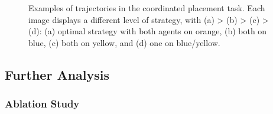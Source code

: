 \begin{figure}[t]
    \centering
    \centering
    \caption{Examples of trajectories in the coordinated placement task. Each image displays a different level of strategy, with (a) > (b) > (c) > (d): (a) optimal strategy with both agents on orange, (b) both on blue, (c) both on yellow, and (d) one on blue/yellow.}
    \label{fig:JIM:coordplace_traj}
\end{figure}





\subsection{Further Analysis}

\subsubsection{Ablation Study}

